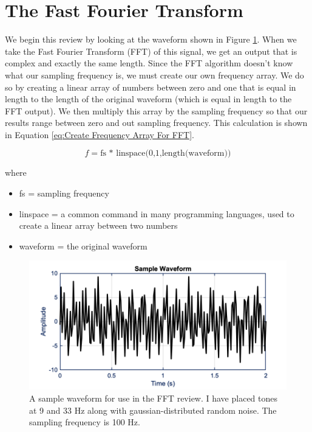 \section{The Fast Fourier Transform}

We begin this review by looking at the waveform shown in Figure \ref{fig:FFT Sample Waveform}.
When we take the Fast Fourier Transform (FFT) of this signal, we get an output that is complex and exactly the same length.
Since the FFT algorithm doesn't know what our sampling frequency is, we must create our own frequency array. We do so by creating a linear array of numbers between zero and one that is equal in length to the length of the original waveform (which is equal in length to the FFT output).
We then multiply this array by the sampling frequency so that our results range between zero and out sampling frequency.
This calculation is shown in Equation \ref{eq:Create Frequency Array For FFT}.

\begin{equation} \label{eq:Create Frequency Array For FFT}
    f = \text{fs * linspace(0,1,length(waveform))}
\end{equation}

where

\begin{itemize}
    \item fs = sampling frequency
    \item linspace = a common command in many programming languages, used to create a linear array between two numbers
    \item waveform = the original waveform
\end{itemize}

\begin{figure}[H]
    \centering
    \includegraphics[width = 6 in]{Chapters/Signal Processing/Figures/Sample Waveform.png}
    \caption{A sample waveform for use in the FFT review. I have placed tones at 9 and 33 Hz along with gaussian-distributed random noise. The sampling frequency is 100 Hz.}
    \label{fig:FFT Sample Waveform}
\end{figure}

